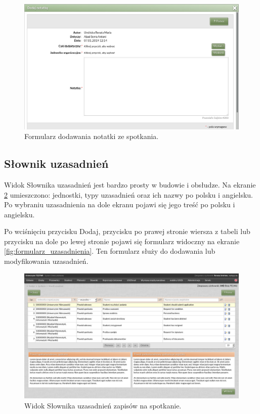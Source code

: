 \documentclass[licencjacka]{pracamgr}
\begin{document}
\begin{figure}[!]
  \includegraphics[width=\linewidth]{formularz_notatek.jpg}
  \caption{Formularz dodawania notatki ze spotkania.}
  \label{fig:formularz_notatek}
\end{figure}

\subsection{Słownik uzasadnień}
Widok Słownika uzasadnień jest bardzo prosty w budowie i obsłudze. Na ekranie \ref{fig:uzasadnienia} umieszczono: jednostki, typy uzasadnień oraz ich nazwy po polsku i angielsku. Po wybraniu uzasadnienia na dole ekranu pojawi się jego treść po polsku i angielsku.

Po wciśnięciu przycisku \textsf{Dodaj}, przycisku po prawej stronie wiersza z tabeli lub przycisku na dole po lewej stronie pojawi się formularz 
widoczny na ekranie \ref{fig:formularz_uzasadnienia}. Ten formularz służy do dodawania lub modyfikowania uzasadnień.

\begin{figure}[!]
  \includegraphics[width=\linewidth]{widok_uzasadnien.jpg}
  \caption{Widok Słownika uzasadnień zapisów na spotkanie.}
  \label{fig:uzasadnienia}
\end{figure}
\end{document}
